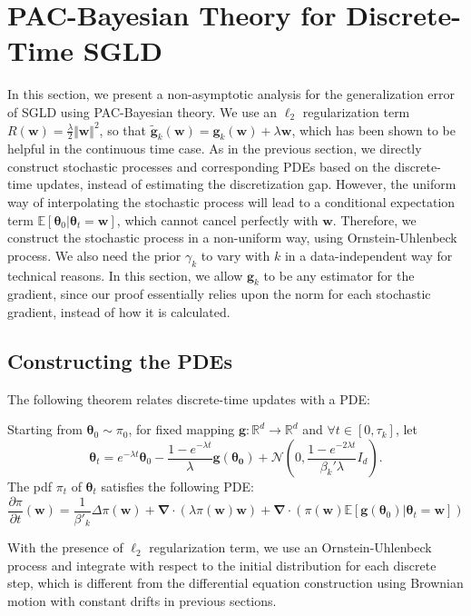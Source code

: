 \documentclass[final,12pt]{colt2018} %
\newcommand{\w}{\bm{w}}
\begin{document}
\section{PAC-Bayesian Theory for Discrete-Time SGLD}
In this section, we present a non-asymptotic analysis for the generalization error of SGLD using PAC-Bayesian theory. We use an $\ell_2$ regularization term $R(\bm{w})=\frac{\lambda}{2}\Vert \bm{w}\Vert^2$, so that $\tilde{\bm{g}}_k(\w)=\bm{g}_k(\w)+\lambda\w$, which has been shown to be helpful in the continuous time case. As in the previous section, we directly construct stochastic processes and corresponding PDEs based on the discrete-time updates, instead of estimating the discretization gap. However, the uniform way of interpolating the stochastic process will lead to a conditional expectation term $\mathbb{E}\left[\bm{\theta}_0|\bm{\theta}_t=\bm{w}\right]$, which cannot cancel perfectly with $\bm{w}$. Therefore, we construct the stochastic process in a non-uniform way, using Ornstein-Uhlenbeck process. We also need the prior $\gamma_k$ to vary with $k$ in a data-independent way for technical reasons. In this section, we allow $\bm{g}_k$ to be any estimator for the gradient, since our proof essentially relies upon the norm for each stochastic gradient, instead of how it is calculated.

\subsection{Constructing the PDEs}
The following theorem relates discrete-time updates with a PDE:
\begin{theorem}\label{new-continuation}
  Starting from $\bm{\theta}_0\sim \pi_0$, for fixed mapping $\bm{g}: \mathbb{R}^d\rightarrow \mathbb{R}^d$ and $\forall t\in[0,\tau_k]$, let
  \begin{equation}  
  \bm{\theta}_t=e^{- \lambda t}\bm{\theta}_0- \frac{1- e^{- \lambda t}}{\lambda}\bm{g}(\bm{\theta_0})+\mathcal{N}\left(0,\frac{1- e^{-2 \lambda t}}{ \beta_k' \lambda}I_d\right).
  \end{equation}
  The pdf $\pi_t$ of $\bm{\theta}_t$ satisfies the following PDE:
  \begin{equation}
  \frac{\partial\pi}{\partial t}(\w)=\frac{1}{\beta'_k}\Delta \pi(\w)+\bm{\nabla}\cdot(\lambda \pi(\w) \bm{w})+\bm{\nabla}\cdot \left(\pi(\w) \mathbb{E}\left[ \bm{g}(\bm{\theta}_0)| \bm{\theta}_t=\bm{w}\right]\right)
  \end{equation}
\end{theorem}
With the presence of $\ell_2$ regularization term, we use an Ornstein-Uhlenbeck process and integrate with respect to the initial distribution for each discrete step, which is different from the differential equation construction using Brownian motion with constant drifts in previous sections.
\end{document}
